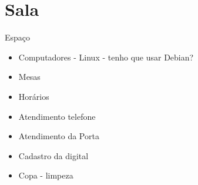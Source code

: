 \section{Sala}

\begin{frame}{Espaço}

\begin{itemize}[<+-|alert@+>]\color{gray}
    \item Computadores - Linux - tenho que usar Debian?
    \item Mesas
    \item Horários
    \item Atendimento telefone
    \item Atendimento da Porta  
    \item Cadastro da digital 
    \item Copa - limpeza
\end{itemize}

\end{frame}